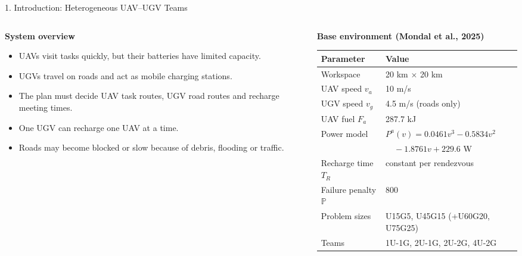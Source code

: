 \documentclass[aspectratio=169,10pt]{beamer}
\begin{document}
\begin{frame}{1. Introduction: Heterogeneous UAV--UGV Teams}
\begin{columns}[T]
\begin{column}{0.54\textwidth}
\textbf{System overview}
\begin{itemize}
  \item UAVs visit tasks quickly, but their batteries have limited capacity.
  \item UGVs travel on roads and act as mobile charging stations.
  \item The plan must decide UAV task routes, UGV road routes and recharge meeting times.
  \item One UGV can recharge one UAV at a time.
  \item Roads may become blocked or slow because of debris, flooding or traffic.
\end{itemize}
\end{column}
\begin{column}{0.43\textwidth}
\textbf{Base environment (Mondal et al., 2025)}\\[1mm]
\scriptsize
\renewcommand{\arraystretch}{1.15}
\begin{tabular}{@{}ll@{}}
\toprule
Parameter & Value\\
\midrule
Workspace & 20 km $\times$ 20 km\\
UAV speed $v_a$ & 10 m/s\\
UGV speed $v_g$ & 4.5 m/s (roads only)\\
UAV fuel $F_a$ & 287.7 kJ\\
Power model & $P^a(v)=0.0461v^3-0.5834v^2$\\
 & $\quad-1.8761v+229.6$ W\\
Recharge time $T_R$ & constant per rendezvous\\
Failure penalty $\mathbb{P}$ & 800\\
Problem sizes & U15G5, U45G15 (+U60G20, U75G25)\\
Teams & 1U-1G, 2U-1G, 2U-2G, 4U-2G\\
\bottomrule
\end{tabular}
\end{column}
\end{columns}
\end{frame}
\end{document}
